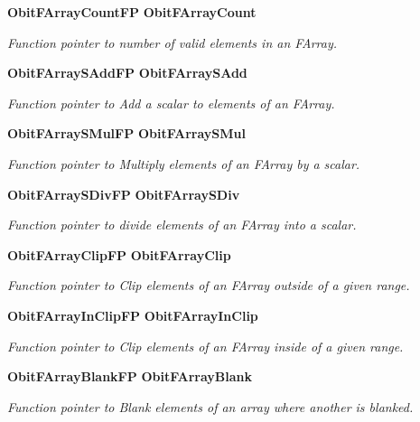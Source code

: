 \begin{CompactItemize}
{\bf Obit\-FArray\-Count\-FP} {\bf Obit\-FArray\-Count}
\begin{CompactList}\small\item\em Function pointer to number of valid elements in an FArray. \item\end{CompactList}\item 
{\bf Obit\-FArray\-SAdd\-FP} {\bf Obit\-FArray\-SAdd}
\begin{CompactList}\small\item\em Function pointer to Add a scalar to elements of an FArray. \item\end{CompactList}\item 
{\bf Obit\-FArray\-SMul\-FP} {\bf Obit\-FArray\-SMul}
\begin{CompactList}\small\item\em Function pointer to Multiply elements of an FArray by a scalar. \item\end{CompactList}\item 
{\bf Obit\-FArray\-SDiv\-FP} {\bf Obit\-FArray\-SDiv}
\begin{CompactList}\small\item\em Function pointer to divide elements of an FArray into a scalar. \item\end{CompactList}\item 
{\bf Obit\-FArray\-Clip\-FP} {\bf Obit\-FArray\-Clip}
\begin{CompactList}\small\item\em Function pointer to Clip elements of an FArray outside of a given range. \item\end{CompactList}\item 
{\bf Obit\-FArray\-In\-Clip\-FP} {\bf Obit\-FArray\-In\-Clip}
\begin{CompactList}\small\item\em Function pointer to Clip elements of an FArray inside of a given range. \item\end{CompactList}\item 
{\bf Obit\-FArray\-Blank\-FP} {\bf Obit\-FArray\-Blank}
\begin{CompactList}\small\item\em Function pointer to Blank elements of an array where another is blanked. \item\end{CompactList}\item 

\end{CompactItemize}

